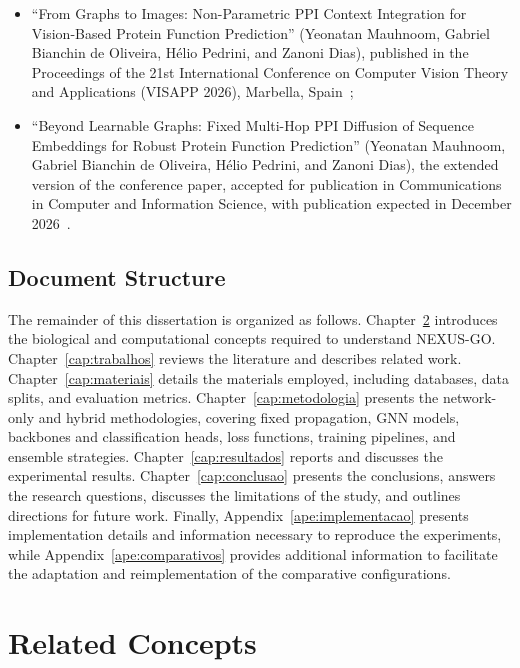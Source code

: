 \documentclass[Ingles]{ic-tese-v3}
\begin{document}
\begin{itemize}
    \item ``From Graphs to Images: Non-Parametric PPI Context Integration for Vision-Based Protein Function Prediction'' (Yeonatan Mauhnoom, Gabriel Bianchin de Oliveira, Hélio Pedrini, and Zanoni Dias), published in the Proceedings of the 21st International Conference on Computer Vision Theory and Applications (VISAPP 2026), Marbella, Spain~\cite{mauhnoom2026graphs};

    \item ``Beyond Learnable Graphs: Fixed Multi-Hop PPI Diffusion of Sequence Embeddings for Robust Protein Function Prediction'' (Yeonatan Mauhnoom, Gabriel Bianchin de Oliveira, Hélio Pedrini, and Zanoni Dias), the extended version of the conference paper, accepted for publication in Communications in Computer and Information Science, with publication expected in December 2026~\cite{mauhnoom2026beyond}.
\end{itemize}

\section{Document Structure}

The remainder of this dissertation is organized as follows. Chapter~\ref{cap:fundamentacao} introduces the biological and computational concepts required to understand NEXUS-GO. Chapter~\ref{cap:trabalhos} reviews the literature and describes related work. Chapter~\ref{cap:materiais} details the materials employed, including databases, data splits, and evaluation metrics. Chapter~\ref{cap:metodologia} presents the network-only and hybrid methodologies, covering fixed propagation, GNN models, backbones and classification heads, loss functions, training pipelines, and ensemble strategies. Chapter~\ref{cap:resultados} reports and discusses the experimental results. Chapter~\ref{cap:conclusao} presents the conclusions, answers the research questions, discusses the limitations of the study, and outlines directions for future work. Finally, Appendix~\ref{ape:implementacao} presents implementation details and information necessary to reproduce the experiments, while Appendix~\ref{ape:comparativos} provides additional information to facilitate the adaptation and reimplementation of the comparative configurations.

\chapter{Related Concepts}
\label{cap:fundamentacao}
\end{document}
